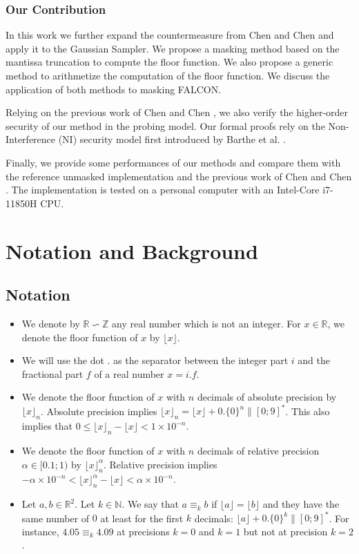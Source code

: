 \documentclass[runningheads]{llncs}
\begin{document}
\subsubsection{Our Contribution}
In this work we further expand the countermeasure from Chen and Chen \cite{Chen_Chen_2024} and apply it to the Gaussian Sampler. We propose a masking method based on the mantissa truncation to compute the floor function. We also propose a generic method to arithmetize the computation of the floor function. We discuss the application of both methods to masking FALCON.

\medskip

Relying on the previous work of Chen and Chen \cite{Chen_Chen_2024}, we also verify the higher-order security of our method in the probing model. Our formal proofs rely on the Non-Interference (NI) security model first introduced by Barthe et al. \cite{10.1145/2976749.2978427}.

\medskip

Finally, we provide some performances of our methods and compare them with the reference unmasked implementation and the previous work of Chen and Chen \cite{Chen_Chen_2024}. The implementation is tested on a personal computer with an Intel-Core i7-11850H CPU.
%
\section{Notation and Background}\label{sec:background}
\subsection{Notation}
\begin{itemize}
  \item We denote by $\mathbb{R}\backsim \mathbb{Z}$ any real number which is not an integer. For $x\in\mathbb{R}$, we denote the floor function of $x$ by $\lfloor x \rfloor$.
  \item We will use the dot $.$ as the separator between the integer part $i$ and the fractional part $f$ of a real number $x=i.f$.
  \item We denote the floor function of $x$ with $n$ decimals of absolute precision by $\lfloor x \rfloor_n$. Absolute precision implies $\lfloor x\rfloor_n = \lfloor x \rfloor + 0.\{0\}^n\|[0;9]^*$. This also implies that $0 \leq \lfloor x \rfloor_n - \lfloor x \rfloor < 1\times 10^{-n}$.
  \item We denote the floor function of $x$ with $n$ decimals of relative precision $\alpha\in[\num{0.1};1)$ by $\lfloor x \rfloor_n^\alpha$. Relative precision implies $-\alpha\times 10^{-n} < \lfloor x \rfloor_n^\alpha - \lfloor x \rfloor < \alpha\times 10^{-n}$.
  \item Let $a,b\in\mathbb{R}^2$. Let $k\in\mathbb{N}$. We say that $a\equiv_k b$ if $\lfloor a\rfloor = \lfloor b \rfloor$ and they have the same number of $0$ at least for the first $k$ decimals: $\lfloor a \rfloor + 0.\{0\}^k\|[0;9]^*$. For instance, $\num{4.05} \equiv_k \num{4.09}$ at precisions $k=0$ and $k=1$ but not at precision $k=2$.
\end{itemize}
% 
\end{document}
